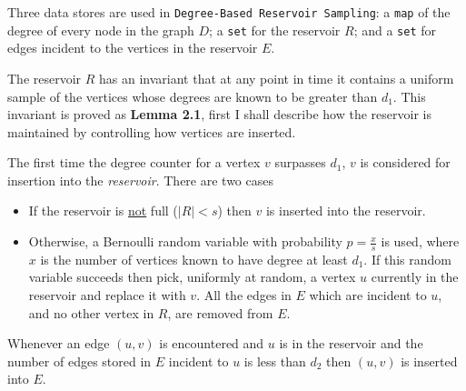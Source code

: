 \documentclass[11pt,twoside,a4paper]{report}
\begin{document}
\par Three data stores are used in \texttt{Degree-Based Reservoir Sampling}: a \texttt{map} of the degree of every node in the graph $D$; a \texttt{set} for the reservoir $R$; and a \texttt{set} for edges incident to the vertices in the reservoir $E$.

\par The reservoir $R$ has an invariant that at any point in time it contains a uniform sample of the vertices whose degrees are known to be greater than $d_1$. This invariant is proved as \textbf{Lemma 2.1}, first I shall describe how the reservoir is maintained by controlling how vertices are inserted.

\par The first time the degree counter for a vertex $v$ surpasses $d_1$, $v$ is considered for insertion into the \textit{reservoir}. There are two cases
\begin{itemize}
	\item If the reservoir is \underline{not} full (\ie $|R|<s$) then $v$ is inserted into the reservoir.
	\item Otherwise, a Bernoulli random variable with probability $p=\frac{x}s$ is used, where $x$ is the number of vertices known to have degree at least $d_1$. If this random variable succeeds then pick, uniformly at random, a vertex $u$ currently in the reservoir and replace it with $v$. All the edges in $E$ which are incident to $u$, and no other vertex in $R$, are removed from $E$.
\end{itemize}

\noindent Whenever an edge $(u,v)$ is encountered and $u$ is in the reservoir and the number of edges stored in $E$ incident to $u$ is less than $d_2$ then $(u,v)$ is inserted into $E$.\newline
\end{document}

